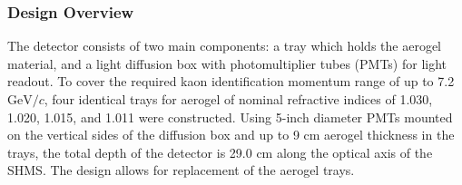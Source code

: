 \subsubsection{Design Overview}

The detector consists of two main components: a tray
which holds the aerogel material, and a light diffusion box with
photomultiplier tubes (PMTs) for light readout. To cover the required
kaon identification momentum range of up to 7.2 $\textrm{GeV}/c$, four identical
trays for aerogel of nominal refractive indices of 1.030, 1.020,
1.015, and 1.011 were constructed. Using 5-inch diameter PMTs mounted
on the vertical sides of the diffusion box and up to 9 cm aerogel
thickness in the trays, the total depth of the detector is 29.0 cm
along the optical axis of the SHMS. The design allows for replacement
of the aerogel trays.


